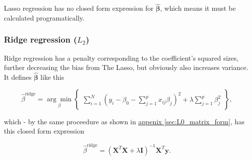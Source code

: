 Lasso regression has no closed form expression for $\hat{\mathbf \beta}$, which means it must be calculated programatically.


\subsubsection{Ridge regression ($L_2$)}
Ridge regression has a penalty corresponding to the coefficient's squared sizes, further decreasing the bias from The Lasso, but obviously also increases variance. It defines $\hat{\mathbf \beta}$ like this

\begin{equation*}
  \hat \beta^{\text{ridge}} = \underset{\beta}{\arg \min} \begin{Bmatrix}\sum_{i=1}^N\left(y_i - \beta_0 - \sum_{j=1}^p x_{ij}\beta_j\right)^2 + \lambda \sum_{j=1}^p \beta_j^2 \end{Bmatrix},
\end{equation*}

which - by the same proceedure as shown in \hyperref[sec:L0_matrix_form]{appenix \ref*{sec:L0_matrix_form}}, has this closed form expression

\begin{equation}
  \hat \beta^{\text{ridge}} = (\mathbf X^T\mathbf X + \lambda \mathbf I)^{-1}\mathbf X^T\mathbf y.
\end{equation}


